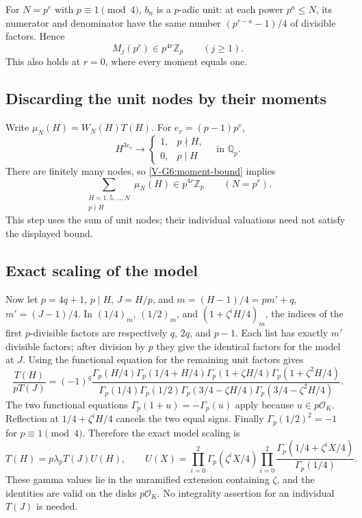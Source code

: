 \documentclass[11pt,letterpaper]{article}
\numberwithin{equation}{section}
\begin{document}
For $N=p^r$ with $p\equiv1\pmod4$, $b_n$ is a $p$-adic unit:
at each power $p^a\le N$, its numerator and denominator have the
same number $(p^{r-a}-1)/4$ of divisible factors. Hence
\begin{equation}\label{V-G6:moment-bound}
 M_j(p^r)\in p^{4r}\mathbb Z_p\qquad(j\ge1).
\end{equation}
This also holds at $r=0$, where every moment equals one.

\subsection{Discarding the unit nodes by their moments}
Write $\mu_N(H)=W_N(H)T(H)$. For $e_v=(p-1)p^v$,
\[
 H^{3e_v}\longrightarrow
 \begin{cases}1,&p\nmid H,\\0,&p\mid H\end{cases}
 \quad\text{in }\mathbb Q_p.
\]
There are finitely many nodes, so \eqref{V-G6:moment-bound} implies
\begin{equation}\label{V-G6:unit-nodes}
 \sum_{\substack{H=1,5,\ldots,N\\p\nmid H}}\mu_N(H)
 \in p^{4r}\mathbb Z_p\qquad(N=p^r).
\end{equation}
This step uses the sum of unit nodes; their individual valuations
need not satisfy the displayed bound.

\subsection{Exact scaling of the model}
Now let $p=4q+1$, $p\mid H$, $J=H/p$, and
$m=(H-1)/4=pm'+q$, $m'=(J-1)/4$.
In $(1/4)_m$, $(1/2)_m$, and $(1+\zeta^iH/4)_m$, the indices of
the first $p$-divisible factors are respectively $q$, $2q$, and
$p-1$. Each list has exactly $m'$ divisible factors; after division
by $p$ they give the identical factors for the model at $J$.
Using the functional equation for the remaining unit factors gives
\[
 \frac{T(H)}{pT(J)}=(-1)^q
 \frac{\Gamma_p(H/4)\Gamma_p(1/4+H/4)
       \Gamma_p(1+\zeta H/4)\Gamma_p(1+\zeta^2H/4)}
 {\Gamma_p(1/4)\Gamma_p(1/2)
       \Gamma_p(3/4-\zeta H/4)\Gamma_p(3/4-\zeta^2H/4)}.
\]
The two functional equations $\Gamma_p(1+u)=-\Gamma_p(u)$
apply because $u\in p\mathcal O_K$.
Reflection at $1/4+\zeta^iH/4$ cancels the two equal signs.
Finally $\Gamma_p(1/2)^2=-1$ for $p\equiv1\pmod4$.
Therefore the exact model scaling is
\begin{equation}\label{V-G6:model-scale}
 T(H)=p\lambda_pT(J)U(H),\qquad
 U(X)=\prod_{i=0}^{2}\Gamma_p(\zeta^iX/4)
       \prod_{i=0}^{2}
       \frac{\Gamma_p(1/4+\zeta^iX/4)}{\Gamma_p(1/4)}.
\end{equation}
These gamma values lie in the unramified extension containing
$\zeta$, and the identities are valid on the disks $p\mathcal O_K$.
No integrality assertion for an individual $T(J)$ is needed.
\end{document}
